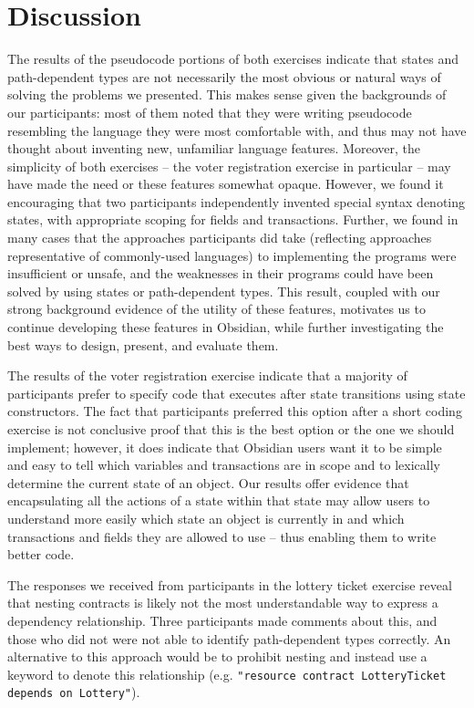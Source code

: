 \documentclass[sigplan,10pt,review]{acmart}\settopmatter{printfolios=true}
\begin{document}
\section{Discussion}

The results of the pseudocode portions of both exercises indicate that states and path-dependent types are not necessarily the most obvious or 
natural ways of solving the problems we presented. This makes sense given the backgrounds of our participants: most of them noted that they 
were writing pseudocode resembling the language they were most comfortable with, and thus may not have thought about inventing new, 
unfamiliar language features. Moreover, the simplicity of both exercises -- the voter registration exercise in particular -- may have made the 
need or these features somewhat opaque. However, we found it encouraging that two participants independently invented special syntax denoting states, with appropriate scoping for fields and transactions. Further, we found in many cases that the approaches participants did take (reflecting approaches representative of commonly-used languages) to implementing the 
programs were insufficient or unsafe, and the weaknesses in their programs could have been solved by using states or path-dependent 
types. This result, coupled with our strong background evidence of the utility of these features, motivates us to continue developing these
features in Obsidian, while further investigating the best ways to design, present, and evaluate them. 

The results of the voter registration exercise indicate that a majority of participants prefer to specify code that executes after state transitions using state constructors. The 
fact that participants preferred this option after a short coding exercise is not conclusive proof that this is the best option or the one we should 
implement; however, it does indicate that Obsidian users want it to be simple and easy to tell which variables and transactions are in scope and to lexically determine the 
current state of an object. Our results offer evidence that encapsulating all the actions of a state within that state may allow users to understand 
more easily which state an object is currently in and which transactions and fields they are allowed to use -- thus enabling them to write better code. 

The responses we received from participants in the lottery ticket exercise reveal that nesting contracts is likely not the most understandable
way to express a dependency relationship. Three participants made comments about this, and those who did not were not 
able to identify path-dependent types correctly. An alternative to this approach would be to prohibit nesting and instead use a keyword
to denote this relationship (e.g. \texttt{\small{"resource contract LotteryTicket depends on Lottery"}}).
\end{document}
